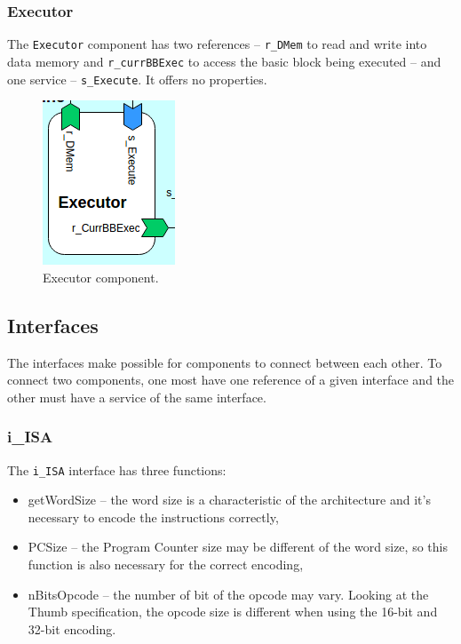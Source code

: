 \documentclass{report}
\begin{document}
			\subsubsection{Executor}
			
			\par The \texttt{Executor} component has two references -- \texttt{r\_DMem} to read and write into data memory and \texttt{r\_currBBExec} to access the basic block being executed -- and one service -- \texttt{s\_Execute}. It offers no properties.

			\begin{figure} [H]
				\centering
				\includegraphics[width=0.3\linewidth]{Images/arch-ref/Executor}
				\caption{Executor component.}
				\label{fig:Executor}
			\end{figure}
			
		\subsection{Interfaces}
		
		\par The interfaces make possible for components to connect between each other. To connect two components, one most have one reference of a given interface and the other must have a service of the same interface.

			\subsubsection*{i\_ISA}
			
			\par The \texttt{i\_ISA} interface has three functions:
			\begin{itemize}
				\item getWordSize -- the word size is a characteristic of the architecture and it's necessary to encode the instructions correctly,
				\item PCSize -- the Program Counter size may be different of the word size, so this function is also necessary for the correct encoding,
				\item nBitsOpcode -- the number of bit of the opcode may vary. Looking at the Thumb specification, the opcode size is different when using the 16-bit and 32-bit encoding. 
			\end{itemize}
			
\end{document}
